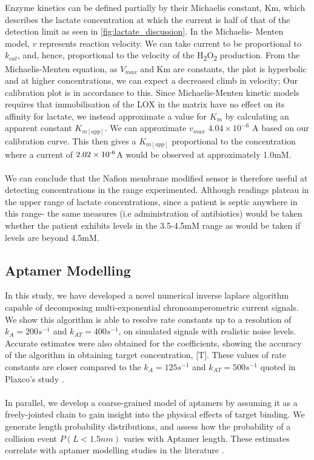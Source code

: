 Enzyme kinetics can be defined partially by their Michaelis constant, Km, which describes the lactate concentration at which the current is half of that of the detection limit as seen in \autoref{fig:lactate_discussion}. In the Michaelis- Menten model, $v$ represents reaction velocity. We can take current to be proportional to $k_{cat}$, and, hence, proportional to the velocity of the H\textsubscript{2}O\textsubscript{2} production. From the Michaelis-Menten equation, as $V_{max}$ and Km are constants, the plot is hyperbolic and at higher concentrations, we can expect a decreased climb in velocity; Our calibration plot is in accordance to this. Since Michaelis-Menten kinetic models requires that immobilisation of the LOX in the matrix have no effect on its affinity for lactate, we instead approximate a value for $K_{m}$ by calculating an apparent constant $K_{m[app]}$. We can approximate $v_{max}$ $4.04\times10^{-6}$ A based on our calibration curve. This then gives a $K_{m[app]}$ proportional to the concentration where a current of $2.02\times 10\textsuperscript{-6}$A would be observed at approximately 1.0mM.\\\\
We can conclude that the Nafion membrane modified sensor is therefore useful at detecting concentrations in the range experimented. Although readings plateau in the upper range of lactate concentrations, since a patient is septic anywhere in this range- the same measures (i.e administration of antibiotics) would be taken whether the patient exhibits levels in the 3.5-4.5mM range as would be taken if levels are beyond 4.5mM.  
\subsection{Aptamer Modelling}
In this study, we have developed a novel numerical inverse laplace algorithm capable of decomposing multi-exponential chronoamperometric current signals. We show this algorithm is able to resolve rate constants up to a resolution of $k_{A} = 200s^{-1}$ and $k_{AT} = 400s^{-1}$, on simulated signals with realistic noise levels. Accurate estimates were also obtained for the coefficients, showing the accuracy of the algorithm in obtaining target concentration, [T]. These values of rate constants are closer compared to the $k_{A} = 125s^{-1}$ and $k_{AT} = 500s^{-1}$ quoted in Plaxco's study \cite{arroyo2018subsecond}.\\\\
In parallel, we develop a coarse-grained model of aptamers by assuming it as a freely-jointed chain to gain insight into the physical effects of target binding. We generate length probability distributions, and assess how the probability of a collision event $P(L<1.5nm)$ varies with Aptamer length. These estimates correlate with aptamer modelling studies in the literature \cite{uzawa2010mechanistic,uzawa2009length}.\\\\